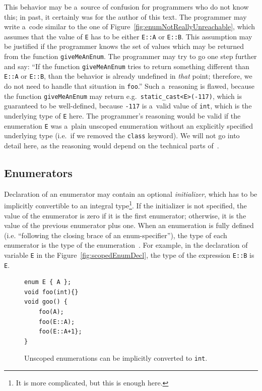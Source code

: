 \documentclass[nolot,nolof,nocover,printed]{fithesis3}
\newcommand{\stdN}[2]{\cite[#2]{#1}\xspace}
\begin{document}
This behavior may be a~source of confusion for programmers who do not know this; in past, it certainly was for the author of this text. The programmer may write a~code similar to the one of Figure~\ref{fig:enumNotReallyUnreachable}, which assumes that the value of \lstinline|E| has to be either \lstinline|E::A| or \lstinline|E::B|. This assumption may be justified if the programmer knows the set of values which may be returned from the function \lstinline|giveMeAnEnum|. The programmer may try to go one step further and say: \enquote{If the function \lstinline|giveMeAnEnum| tries to return something different than \lstinline|E::A| or \lstinline|E::B|, than the behavior is already undefined in \textit{that} point; therefore, we do not need to handle that situation in \lstinline|foo|.} Such a~reasoning is flawed, because the function \lstinline|giveMeAnEnum| may return e.g.~\lstinline|static_cast<E>(-117)|, which is guaranteed to be well-defined, because \lstinline|-117| is a~valid value of \lstinline|int|, which is the underlying type of \lstinline|E| here. The programmer's reasoning would be valid if the enumeration \lstinline|E| was a~plain unscoped enumeration without an explicitly specified underlying type (i.e.~if we removed the \lstinline|class| keyword). We will not go into detail here, as the reasoning would depend on the technical parts of~\stdN{n4296}{\S 7.2/8}.

\subsection{Enumerators}\label{sec:enumerators}

Declaration of an enumerator may contain an optional \textit{initializer}, which has to be implicitly convertible to an integral type\footnote{It is more complicated, but this is enough here.}. If the initializer is not specified, the value of the enumerator is zero if it is the first enumerator; otherwise, it is the value of the previous enumerator plus one. When an enumeration is fully defined (i.e. \enquote{following the closing brace of an enum-specifier}), the type of each enumerator is the type of the enumeration~\stdN{n4296}{\S 7.2/5}. For example, in the declaration of variable \lstinline|E| in the Figure~\ref{fig:scopedEnumDecl}, the type of the expression \lstinline|E::B| is \lstinline|E|.

\begin{figure}
\begin{lstlisting}
enum E { A };
void foo(int){}
void goo() {
    foo(A);
    foo(E::A);
    foo(E::A+1};
}
\end{lstlisting}
\caption{Unscoped enumerations can be implicitly converted to \lstinline|int|.}
\label{fig:unscopedEnumToInt}
\end{figure}
\end{document}
